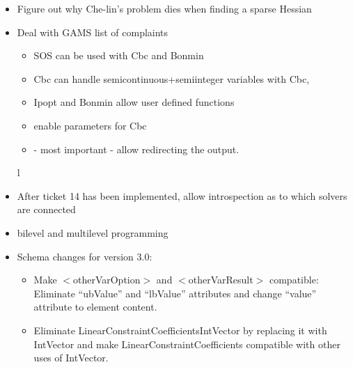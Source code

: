 \begin{itemize}
\item Figure out why Che-lin's problem dies when finding a sparse Hessian

\item Deal with GAMS list of complaints

\begin{itemize}
\item SOS can be used with Cbc and Bonmin
\item Cbc can handle semicontinuous+semiinteger variables with Cbc, 
\item Ipopt and Bonmin allow user defined functions
\item enable parameters for Cbc 
\item - most important - allow redirecting the output.
\end{itemize}

%
%
%
l%
%
%
%
\item After ticket 14 has been implemented, allow introspection as to which solvers are connected 

\item bilevel and multilevel programming

\item Schema changes for version 3.0:

\begin{itemize}
\item Make $<$otherVarOption$>$ and $<$otherVarResult$>$ compatible: Eliminate ``ubValue'' and ``lbValue'' attributes and change ``value'' attribute to element content.

\item Eliminate LinearConstraintCoefficientsIntVector by replacing it with IntVector and make LinearConstraintCoefficients compatible with other uses of IntVector.

\end{itemize}

\end{itemize}

\fi
